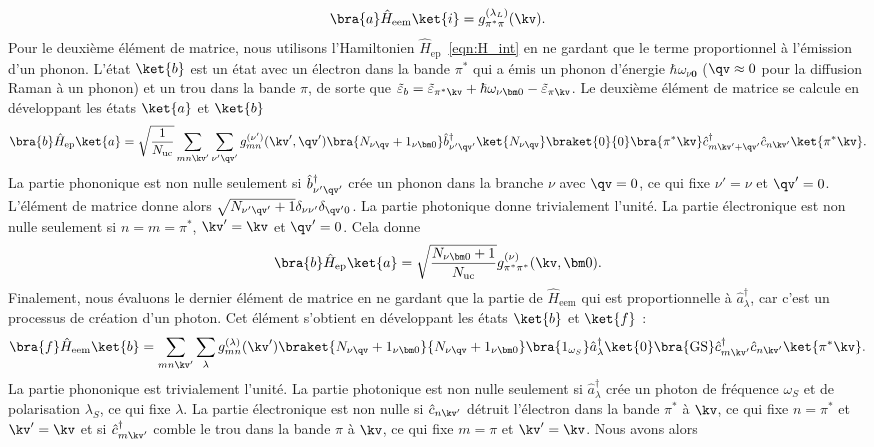 \begin{equation}
    \bra{a}\hat{H}_\text{eem}\ket{i}=g_{\pi^*\pi}^{(\lambda_L)}(\kv).
\end{equation}
Pour le deuxième élément de matrice, nous utilisons l'Hamiltonien $\hat{H}_\text{ep}$~\eqref{eqn:H_int} en ne gardant que le terme proportionnel à l'émission d'un phonon. L'état $\ket{b}$ est un état avec un électron dans la bande $\pi^*$ qui a émis un phonon d'énergie $\hbar\omega_{\nu\bm 0}$ ($\qv\approx 0$ pour la diffusion Raman à un phonon) et un trou dans la bande $\pi$, de sorte que $\tilde{\varepsilon}_b = \tilde{\varepsilon}_{\pi^*\kv}+\hbar\omega_{\nu\bm 0}-\tilde{\varepsilon}_{\pi\kv}$. Le deuxième élément de matrice se calcule en développant les états $\ket{a}$ et $\ket{b}$
\begin{equation}
    \bra{b}\hat{H}_\text{ep}\ket{a} = \sqrt{\frac{1}{N_\text{uc}}}\sum_{mn\kv'}\sum_{\nu'\qv'}g_{mn}^{(\nu')}(\kv',\qv')\bra{N_{\nu\qv}+1_{\nu\bm 0}}\hat{b}^\dag_{\nu'\qv'}\ket{N_{\nu\qv}}\braket{0}{0}\bra{\pi^*\kv}\hat{c}^\dag_{m\kv'+\qv'}\hat{c}_{n\kv'}\ket{\pi^*\kv}.
\end{equation}
La partie phononique est non nulle seulement si $\hat{b}^\dag_{\nu'\qv'}$ crée un phonon dans la branche $\nu$ avec $\qv=0$, ce qui fixe $\nu'=\nu$ et $\qv'=0$. L'élément de matrice donne alors $\sqrt{N_{\nu'\qv'}+1}\delta_{\nu\nu'}\delta_{\qv'0}$. La partie photonique donne trivialement l'unité. La partie électronique est non nulle seulement si $n=m=\pi^*$, $\kv'=\kv$ et $\qv'=0$. Cela donne
\begin{equation}
    \bra{b}\hat{H}_\text{ep}\ket{a} = \sqrt{\frac{N_{\nu\bm 0}+1}{N_\text{uc}}}g_{\pi^*\pi^*}^{(\nu)}(\kv,\bm 0).
\end{equation}
Finalement, nous évaluons le dernier élément de matrice en ne gardant que la partie de $\hat{H}_\text{eem}$ qui est proportionnelle à $\hat{a}^\dag_{\lambda}$, car c'est un processus de création d'un photon. Cet élément s'obtient en développant les états $\ket{b}$ et $\ket{f}$ :
\begin{equation}
    \bra{f}\hat{H}_\text{eem}\ket{b} = \sum_{mn\kv'}\sum_{\lambda}g_{mn}^{(\lambda)}(\kv')\braket{N_{\nu\qv}+1_{\nu\bm 0}}{N_{\nu\qv}+1_{\nu\bm 0}}\bra{1_{\omega_S}}\hat{a}_{\lambda}^\dag\ket{0}\bra{\text{GS}}\hat{c}_{m\kv'}^\dag\hat{c}_{n\kv'}\ket{\pi^*\kv}.
\end{equation}
La partie phononique est trivialement l'unité. La partie photonique est non nulle seulement si $\hat{a}_\lambda^\dag$ crée un photon de fréquence $\omega_S$ et de polarisation $\lambda_S$, ce qui fixe $\lambda$. La partie électronique est non nulle si $\hat{c}_{n\kv'}$ détruit l'électron dans la bande $\pi^*$ à $\kv$, ce qui fixe $n=\pi^*$ et $\kv'=\kv$ et si $\hat{c}_{m\kv'}^\dag$ comble le trou dans la bande $\pi$ à $\kv$, ce qui fixe $m=\pi$ et $\kv'=\kv$. Nous avons alors
